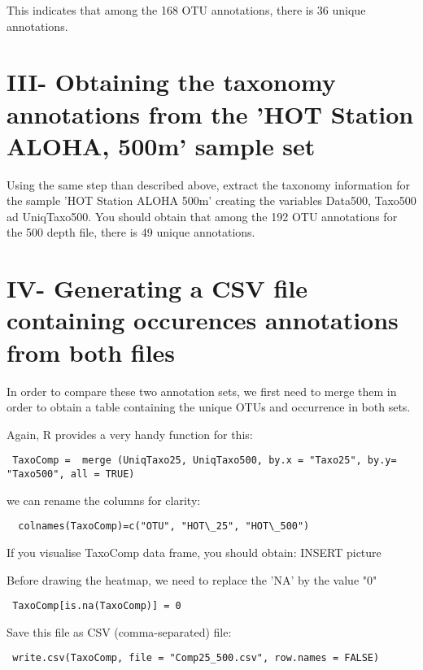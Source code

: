 \documentclass[a4paper,12pt,twoside]{memoir}
\begin{document}
\begin{note}
This indicates that among the 168 OTU annotations, there is 36 unique annotations. 
\end{note}

\section{III- Obtaining the taxonomy annotations from the 'HOT Station ALOHA, 500m' sample set}

\begin{information}
Using the same step than described above, extract the taxonomy information for the sample 'HOT Station ALOHA 500m' creating the variables Data500, Taxo500 ad UniqTaxo500.
You should obtain that among the 192 OTU annotations for the 500 depth file, there is 49 unique annotations. 
\end{information}

\section{IV- Generating a CSV file containing occurences annotations from both files}

\begin{note}
In order to compare these two annotation sets, we first need to merge them in order to obtain a table containing the unique OTUs and occurrence in both sets.
\end{note}

\begin{steps}
 Again, R provides a very handy function for this:
\begin{lstlisting} 
 TaxoComp =  merge (UniqTaxo25, UniqTaxo500, by.x = "Taxo25", by.y= "Taxo500", all = TRUE)
\end{lstlisting}  
we can rename the columns for clarity:
\begin{lstlisting}
  colnames(TaxoComp)=c("OTU", "HOT\_25", "HOT\_500")
\end{lstlisting}
\end{steps}

\begin{information}
If you visualise TaxoComp data frame, you should obtain:
INSERT picture
\end{information}

\begin{steps}
 Before drawing the heatmap, we need to replace the 'NA' by the value "0"
\begin{lstlisting}
 TaxoComp[is.na(TaxoComp)] = 0
\end{lstlisting}
 Save this file as CSV (comma-separated) file:
\begin{lstlisting}
 write.csv(TaxoComp, file = "Comp25_500.csv", row.names = FALSE)
\end{lstlisting}
\end{steps}
\end{document}
